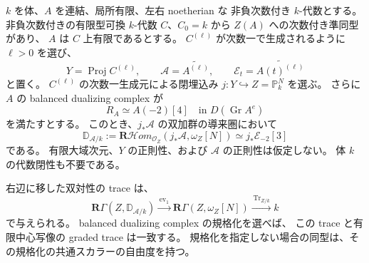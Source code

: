 \begin{lemma}[有限中心模型の双加群双対化]
\label{lem:finite-central-field-dualizing-bimodule}
$k$ を体、$A$ を連結、局所有限、左右 noetherian な
非負次数付き $k$-代数とする。
非負次数付きの有限型可換 $k$-代数 $C$、$C_0=k$ から
$Z(A)$ への次数付き準同型があり、
$A$ は $C$ 上有限であるとする。
$C^{(\ell)}$ が次数一で生成されるように $\ell>0$ を選び、
\[
 Y=\operatorname{Proj}C^{(\ell)},\qquad
 \mathscr A=\widetilde{A^{(\ell)}},\qquad
 \mathscr E_t=\widetilde{A(t)^{(\ell)}}
\]
と置く。
$C^{(\ell)}$ の次数一生成元による閉埋込み
$j:Y\hookrightarrow Z=\mathbb P^N_k$ を選ぶ。
さらに $A$ の balanced dualizing complex が
\begin{equation}\label{eq:field-balanced-dualizing-input}
 R_A\simeq A(-2)[4]
 \quad\text{in }D(\operatorname{Gr}A^e)
\end{equation}
を満たすとする。
このとき、$j_*\mathscr A$ の双加群の導来圏において
\begin{equation}\label{eq:field-groth-dualizing-bimodule}
 \mathbb D_{\mathscr A/k}
 :=\mathbf R\mathcal Hom_{\mathcal O_Z}
       (j_*\mathscr A,\omega_Z[N])
 \simeq j_*\mathscr E_{-2}[3]
\end{equation}
である。
有限大域次元、$Y$ の正則性、および $\mathscr A$ の正則性は仮定しない。
体 $k$ の代数閉性も不要である。

右辺に移した双対性の trace は、
\begin{equation}\label{eq:field-groth-dualizing-trace}
 \mathbf R\Gamma(Z,\mathbb D_{\mathscr A/k})
 \xrightarrow{\,\operatorname{ev}_1\,}
 \mathbf R\Gamma(Z,\omega_Z[N])
 \xrightarrow{\,\operatorname{Tr}_{Z/k}\,}k
\end{equation}
で与えられる。
balanced dualizing complex の規格化を選べば、
この trace と有限中心写像の graded trace は一致する。
規格化を指定しない場合の同型は、その規格化の共通スカラーの自由度を持つ。
\end{lemma}

